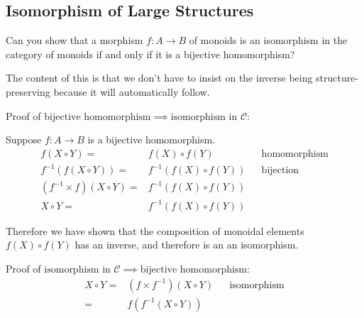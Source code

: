 \subsection{Isomorphism of Large Structures}
\begin{ttta}
	Can you show that a morphism $f:A\rightarrow B$ of monoids is an isomorphism in the
	category of monoids if and only if it is a bijective homomorphism?
\end{ttta}
The content of this is that we don’t have to insist on the inverse being
structure-preserving because it will automatically follow.

\begin{proofitem}
	\item Proof of $\text{bijective homomorphism}\implies \text{isomorphism in
		}\mathcal{C}$:
	\item Suppose $f:A\rightarrow B$ is a bijective homomorphism.
	\begin{align*}
		f(X\circ Y) =                & f(X) \circ f(Y)         &  & \text{homomorphism} \\
		f^{-1}(f(X\circ Y)) =        & f^{-1}(f(X) \circ f(Y)) &  & \text{bijection}    \\
		(f^{-1}\times f)(X\circ Y) = & f^{-1}(f(X) \circ f(Y))                          \\
		X\circ Y =                   & f^{-1}(f(X) \circ f(Y))
	\end{align*}
	\item
	Therefore we have shown that the composition of monoidal elements
	$f(X) \circ f(Y)$ has an inverse, and therefore is an an isomorphism.
\end{proofitem}
\begin{proofitem}
	\item
	Proof of $ \text{isomorphism in }\mathcal{C} \implies \text{bijective
			homomorphism} $:
	\begin{align*}
		X\circ Y = & (f\times f^{-1})(X\circ Y) &  & \text{isomorphism} \\
		=          & f(f^{-1}(X\circ Y))
	\end{align*}
	\item
\end{proofitem}


